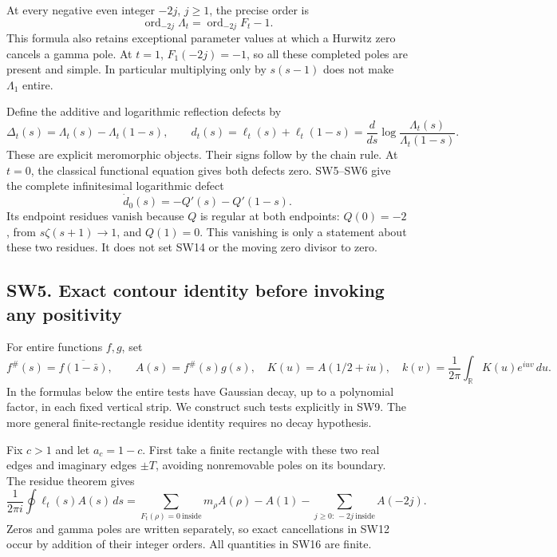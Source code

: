 \documentclass[
  10pt,
  a4paper,
]{article}
\begin{document}
At every negative even integer \(-2j\), \(j\ge1\), the precise order is
\[
\operatorname {ord}_{-2j}\Lambda_t
=\operatorname {ord}_{-2j}F_t-1.
\tag{SW12}
\] This formula also retains exceptional parameter values at which a
Hurwitz zero cancels a gamma pole. At \(t=1\), \(F_1(-2j)=-1\), so all
these completed poles are present and simple. In particular multiplying
only by \(s(s-1)\) does not make \(\Lambda_1\) entire.

Define the additive and logarithmic reflection defects by \[
\Delta_t(s)=\Lambda_t(s)-\Lambda_t(1-s),\qquad
d_t(s)=\ell_t(s)+\ell_t(1-s)
=\frac d{ds}\log\frac{\Lambda_t(s)}{\Lambda_t(1-s)}.
\tag{SW13}
\] These are explicit meromorphic objects. Their signs follow by the
chain rule. At \(t=0\), the classical functional equation gives both
defects zero. SW5--SW6 give the complete infinitesimal logarithmic
defect \[
\dot d_0(s)=-Q'(s)-Q'(1-s).
\tag{SW14}
\] Its endpoint residues vanish because \(Q\) is regular at both
endpoints: \(Q(0)=-2\), from \(s\zeta(s+1)\to1\), and \(Q(1)=0\). This
vanishing is only a statement about these two residues. It does not set
SW14 or the moving zero divisor to zero.

\subsection{SW5. Exact contour identity before invoking any
positivity}\label{sw5.-exact-contour-identity-before-invoking-any-positivity}

For entire functions \(f,g\), set \[
f^\#(s)=\overline{f(1-\bar s)},\qquad A(s)=f^\#(s)g(s),
\quad K(u)=A(1/2+iu),\quad
k(v)=\frac1{2\pi}\int_{\mathbb R}K(u)e^{iuv}\,du.
\tag{SW15}
\] In the formulas below the entire tests have Gaussian decay, up to a
polynomial factor, in each fixed vertical strip. We construct such tests
explicitly in SW9. The more general finite-rectangle residue identity
requires no decay hypothesis.

Fix \(c>1\) and let \(a_c=1-c\). First take a finite rectangle with
these two real edges and imaginary edges \(\pm T\), avoiding
nonremovable poles on its boundary. The residue theorem gives \[
\frac1{2\pi i}\oint\ell_t(s)A(s)\,ds
=\sum_{F_t(\rho)=0\ \mathrm{inside}}m_\rho A(\rho)
-A(1)-\sum_{j\ge0:\,-2j\ \mathrm{inside}}A(-2j).
\tag{SW16}
\] Zeros and gamma poles are written separately, so exact cancellations
in SW12 occur by addition of their integer orders. All quantities in
SW16 are finite.
\end{document}
